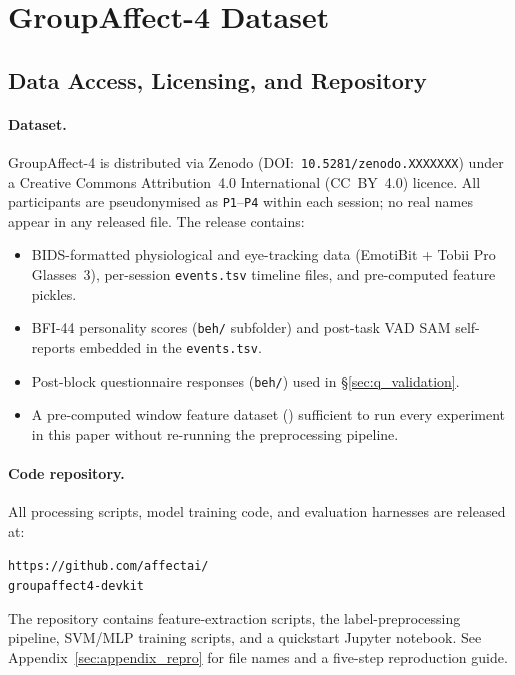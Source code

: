 \documentclass[sigconf,nonacm]{acmart}
\begin{document}
\section{GroupAffect-4 Dataset}
\label{sec:dataset}

\subsection{Data Access, Licensing, and Repository}
\label{sec:data_access}

\paragraph{Dataset.}
GroupAffect-4 is distributed via Zenodo (DOI:~\texttt{10.5281/zenodo.XXXXXXX})
under a Creative Commons Attribution~4.0 International (CC~BY~4.0) licence.
All participants are pseudonymised as \texttt{P1}--\texttt{P4} within each
session; no real names appear in any released file.
The release contains:
\begin{itemize}[leftmargin=1.2em,topsep=2pt,itemsep=1pt]
  \item BIDS-formatted physiological and eye-tracking data (EmotiBit +
        Tobii Pro Glasses~3), per-session \texttt{events.tsv} timeline files, and
        pre-computed feature pickles.
  \item BFI-44 personality scores (\texttt{beh/} subfolder) and post-task
        VAD SAM self-reports embedded in the \texttt{events.tsv}.
  \item Post-block questionnaire responses (\texttt{beh/}) used in
        \S\ref{sec:q_validation}.
  \item A pre-computed window feature dataset
        ()
        sufficient to run every experiment in this paper without re-running
        the preprocessing pipeline.
\end{itemize}

\paragraph{Code repository.}
All processing scripts, model training code, and evaluation harnesses are
released at:
\begin{center}
  \texttt{https://github.com/affectai/}\\\texttt{groupaffect4-devkit}
\end{center}
The repository contains feature-extraction scripts, the label-preprocessing
pipeline, SVM/MLP training scripts, and a quickstart Jupyter notebook.
See Appendix~\ref{sec:appendix_repro} for file names and a five-step
reproduction guide.
\end{document}
